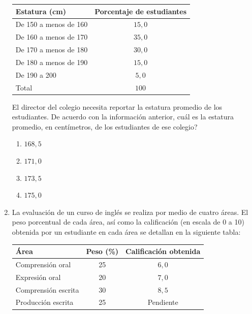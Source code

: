 \documentclass[11pt]{article}
\newcommand{\opcion}[2]{\item $#2$}
\begin{document}
\begin{enumerate}[label=\textbf{\arabic*.}, itemsep=2.5cm]
\begin{center}
\renewcommand{\arraystretch}{1.2}
\begin{tabular}{|l|c|}
\hline
\textbf{Estatura (cm)} & \textbf{Porcentaje de estudiantes} \\
\hline
De 150 a menos de 160 & $15{,}0$ \\
De 160 a menos de 170 & $35{,}0$ \\
De 170 a menos de 180 & $30{,}0$ \\
De 180 a menos de 190 & $15{,}0$ \\
De 190 a 200 & $5{,}0$ \\
\hline
Total & $100$ \\
\hline
\end{tabular}
\end{center}

El director del colegio necesita reportar la estatura promedio de los estudiantes. De acuerdo con la informaci\'on anterior, \textquestiondown cu\'al es la estatura promedio, en cent\'imetros, de los estudiantes de ese colegio?

\begin{enumerate}[label=\Alph*)]
  \item $168{,}5$
  \opcion{B}{171{,}0}
  \item $173{,}5$
  \item $175{,}0$
\end{enumerate}

\Needspace{0.52\textheight}
\item
La evaluaci\'on de un curso de ingl\'es se realiza por medio de cuatro \'areas. El peso porcentual de cada \'area, as\'i como la calificaci\'on (en escala de 0 a 10) obtenida por un estudiante en cada \'area se detallan en la siguiente tabla:

\begin{center}
\renewcommand{\arraystretch}{1.2}
\begin{tabular}{|l|c|c|}
\hline
\textbf{\'Area} & \textbf{Peso (\%)} & \textbf{Calificaci\'on obtenida} \\
\hline
Comprensi\'on oral & 25 & $6{,}0$ \\
Expresi\'on oral & 20 & $7{,}0$ \\
Comprensi\'on escrita & 30 & $8{,}5$ \\
Producci\'on escrita & 25 & Pendiente \\
\hline
\end{tabular}
\end{center}


\end{enumerate}
\end{document}
